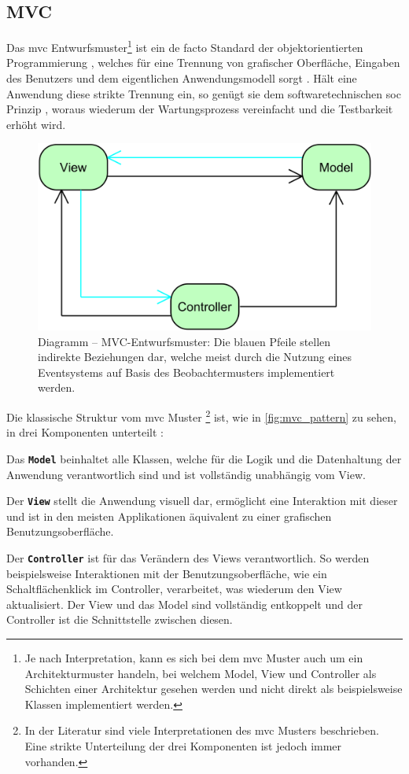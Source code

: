 \subsection{MVC}
Das \ac{mvc} Entwurfsmuster\footnote{Je nach Interpretation, kann es sich bei dem \ac{mvc} Muster auch um ein Architekturmuster handeln, bei welchem Model, View und Controller als Schichten einer Architektur gesehen werden und nicht direkt als beispielsweise Klassen implementiert werden.} ist ein de facto Standard der objektorientierten Programmierung \cite{Deacon1995}, welches für eine Trennung von grafischer Oberfläche, Eingaben des Benutzers und dem eigentlichen Anwendungsmodell sorgt \cite{Burbeck1992}. Hält eine Anwendung diese strikte Trennung ein, so genügt sie dem softwaretechnischen \ac{soc} Prinzip \cite{Grant2014}, woraus wiederum der Wartungsprozess vereinfacht und die Testbarkeit erhöht wird.
\begin{figure}[H]
	\centering
	\includegraphics[width=\textwidth-2cm]{Abbildungen/MVC Pattern.png}
	\caption[Diagramm -- MVC-Entwurfsmuster]{Diagramm -- MVC-Entwurfsmuster: Die blauen Pfeile stellen indirekte Beziehungen dar, welche meist durch die Nutzung eines Eventsystems auf Basis des Beobachtermusters implementiert werden.}
	\label{fig:mvc_pattern}
\end{figure}
\noindent Die klassische Struktur vom \ac{mvc} Muster \footnote{In der Literatur sind viele Interpretationen des \ac{mvc} Musters beschrieben. Eine strikte Unterteilung der drei Komponenten ist jedoch immer vorhanden.} ist, wie in \autoref{fig:mvc_pattern} zu sehen, in drei Komponenten unterteilt \cite{Deacon1995}:
\begin{description}
	\item Das \texttt{\textbf{Model}} beinhaltet alle Klassen, welche für die Logik und die Datenhaltung der Anwendung verantwortlich sind und ist vollständig unabhängig vom View.
	\item Der \texttt{\textbf{View}} stellt die Anwendung visuell dar, ermöglicht eine Interaktion mit dieser und ist in den meisten Applikationen äquivalent zu einer grafischen Benutzungsoberfläche.
	\item Der \texttt{\textbf{Controller}} ist für das Verändern des Views verantwortlich. So werden beispielsweise Interaktionen mit der Benutzungsoberfläche, wie ein Schaltflächenklick im Controller, verarbeitet, was wiederum den View aktualisiert. Der View und das Model sind vollständig entkoppelt und der Controller ist die Schnittstelle zwischen diesen.
\end{description}
